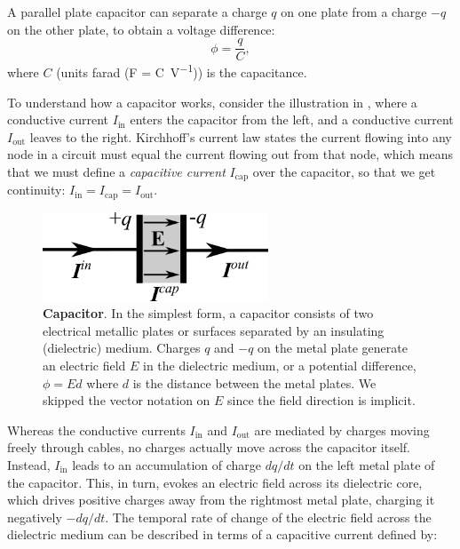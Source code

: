 A parallel plate capacitor can separate a charge $q$ on one plate from a charge $-q$ on the other plate, to obtain a voltage difference:
\begin{equation}
\phi = \frac{q}{C},
\label{eq:Basics:Vcap}
\end{equation}
where $C$ (units farad (\si{\farad} = \si{\coulomb\per\volt})) is the capacitance.

To understand how a capacitor works, consider the illustration in , where a conductive current $I_\text{in}$ enters the capacitor from the left, and a conductive current $I_\text{out}$ leaves to the right. Kirchhoff's current law states the current flowing into any node in a circuit must equal the current flowing out from that node, which means that we must define
a \textit{capacitive current} $I_\text{cap}$ over the capacitor, so that we get continuity: $I_\text{in} = I_\text{cap} = I_\text{out}$. 

\begin{figure}[!ht]
\begin{center}
\includegraphics[width=0.6\textwidth]{Figures/Basics/Capacitor.png}
\end{center}
\caption{{\bf Capacitor}.  In the simplest form, a capacitor consists of two electrical metallic plates or surfaces separated by an insulating (dielectric) medium. Charges $q$ and $-q$ on the metal plate generate an electric field $E$ in the dielectric medium, or a potential difference, $\phi = Ed$ where $d$ is the distance between the metal plates. We skipped the vector notation on $E$ since the field direction is implicit.
}
\label{fig:Basics:Capacitor}
\end{figure}

Whereas the conductive currents $I_\text{in}$ and $I_\text{out}$ are mediated by charges moving freely through cables, no charges actually move across the capacitor itself. Instead, $I_\text{in}$ leads to an accumulation of charge $dq/dt$ on the left metal plate of the capacitor. This, in turn, evokes an electric field across its dielectric core, which drives positive charges away from the rightmost metal plate, charging it negatively $-dq/dt$. The temporal rate of change of the electric field across the dielectric medium can be described in terms of a capacitive current defined by:

